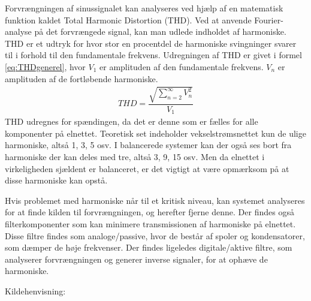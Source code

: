 Forvrængningen af sinussignalet kan analyseres ved hjælp af en matematisk funktion kaldet Total Harmonic Distortion (THD). Ved at anvende Fourier-analyse på det forvrængede signal, kan man udlede indholdet af harmoniske. THD er et udtryk for hvor stor en procentdel de harmoniske svingninger svarer til i forhold til den fundamentale frekvens. Udregningen af THD er givet i formel \ref{eq:THDgenerel}, hvor $V_1$ er amplituden af den fundamentale frekvens. $V_n$ er amplituden af de fortløbende harmoniske. 
\begin{align}
THD = \dfrac{\sqrt{\sum_{n=2}^{\infty}V_n^{2}}}{V_{1}}
\label{eq:THDgenerel}
\end{align}
THD udregnes for spændingen, da det er denne som er fælles for alle komponenter på elnettet. Teoretisk set indeholder vekselstrømsnettet kun de ulige harmoniske, altså 1, 3, 5 osv. I balancerede systemer kan der også ses bort fra harmoniske der kan deles med tre, altså 3, 9, 15 osv. Men da elnettet i virkeligheden sjældent er balanceret, er det vigtigt at være opmærksom på at disse harmoniske kan opstå. \newline

Hvis problemet med harmoniske når til et kritisk niveau, kan systemet analyseres for at finde kilden til forvrængningen, og herefter fjerne denne. Der findes også filterkomponenter som kan minimere transmissionen af harmoniske på elnettet. Disse filtre findes som analoge/passive, hvor de består af spoler og kondensatorer, som dæmper de høje frekvenser. Der findes ligeledes digitale/aktive filtre, som analyserer forvrængningen og generer inverse signaler, for at ophæve de harmoniske.\cite{HarmoniskeFiltre}\newline


Kildehenvisning: \cite{HarmoniskeVideo}
 

